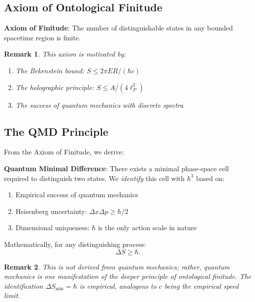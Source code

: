 \documentclass[12pt, a4paper]{article}
\newtheorem{remark}{Remark}
\begin{document}
\subsection{Axiom of Ontological Finitude}

\begin{tcolorbox}[colback=green!5!white, colframe=green!75!black, title=Fundamental Axiom]
\textbf{Axiom of Finitude}: The number of distinguishable states in any bounded spacetime region is finite.
\end{tcolorbox}

\begin{remark}
This axiom is motivated by:
\begin{enumerate}
    \item The Bekenstein bound: $S \leq 2\pi ER/(\hbar c)$
    \item The holographic principle: $S \leq A/(4\ell_P^2)$
    \item The success of quantum mechanics with discrete spectra
\end{enumerate}
\end{remark}

\subsection{The QMD Principle}

From the Axiom of Finitude, we derive:

\begin{tcolorbox}[colback=green!5!white, colframe=green!75!black, title=QMD Principle]
\textbf{Quantum Minimal Difference}: There exists a minimal phase-space cell required to distinguish two states. We \textit{identify} this cell with $\hbar^3$ based on:
\begin{enumerate}
    \item Empirical success of quantum mechanics
    \item Heisenberg uncertainty: $\Delta x \Delta p \geq \hbar/2$
    \item Dimensional uniqueness: $\hbar$ is the only action scale in nature
\end{enumerate}
\end{tcolorbox}

Mathematically, for any distinguishing process:
\begin{equation}
    \Delta S \geq \hbar.
    \label{eq:QMD}
\end{equation}

\begin{remark}
This is not derived from quantum mechanics; rather, quantum mechanics is one manifestation of the deeper principle of ontological finitude. The identification $\Delta S_{\min} = \hbar$ is empirical, analogous to $c$ being the empirical speed limit.
\end{remark}
\end{document}

